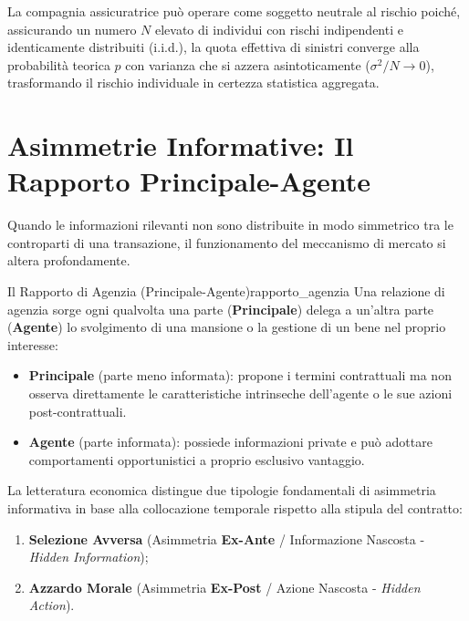 \begin{osservazione}
La compagnia assicuratrice può operare come soggetto neutrale al rischio poiché, assicurando un numero $N$ elevato di individui con rischi indipendenti e identicamente distribuiti (i.i.d.), la quota effettiva di sinistri converge alla probabilità teorica $p$ con varianza che si azzera asintoticamente ($\sigma^2/N \to 0$), trasformando il rischio individuale in certezza statistica aggregata.
\end{osservazione}

\section{Asimmetrie Informative: Il Rapporto Principale-Agente}

Quando le informazioni rilevanti non sono distribuite in modo simmetrico tra le controparti di una transazione, il funzionamento del meccanismo di mercato si altera profondamente.

\begin{definizione}{Il Rapporto di Agenzia (Principale-Agente)}{rapporto_agenzia}
Una relazione di agenzia sorge ogni qualvolta una parte (\textbf{Principale}) delega a un'altra parte (\textbf{Agente}) lo svolgimento di una mansione o la gestione di un bene nel proprio interesse:
\begin{itemize}
    \item \textbf{Principale} (parte meno informata): propone i termini contrattuali ma non osserva direttamente le caratteristiche intrinseche dell'agente o le sue azioni post-contrattuali.
    \item \textbf{Agente} (parte informata): possiede informazioni private e può adottare comportamenti opportunistici a proprio esclusivo vantaggio.
\end{itemize}
\end{definizione}

La letteratura economica distingue due tipologie fondamentali di asimmetria informativa in base alla collocazione temporale rispetto alla stipula del contratto:
\begin{enumerate}
    \item \textbf{Selezione Avversa} (Asimmetria \textbf{Ex-Ante} / Informazione Nascosta - \textit{Hidden Information});
    \item \textbf{Azzardo Morale} (Asimmetria \textbf{Ex-Post} / Azione Nascosta - \textit{Hidden Action}).
\end{enumerate}

